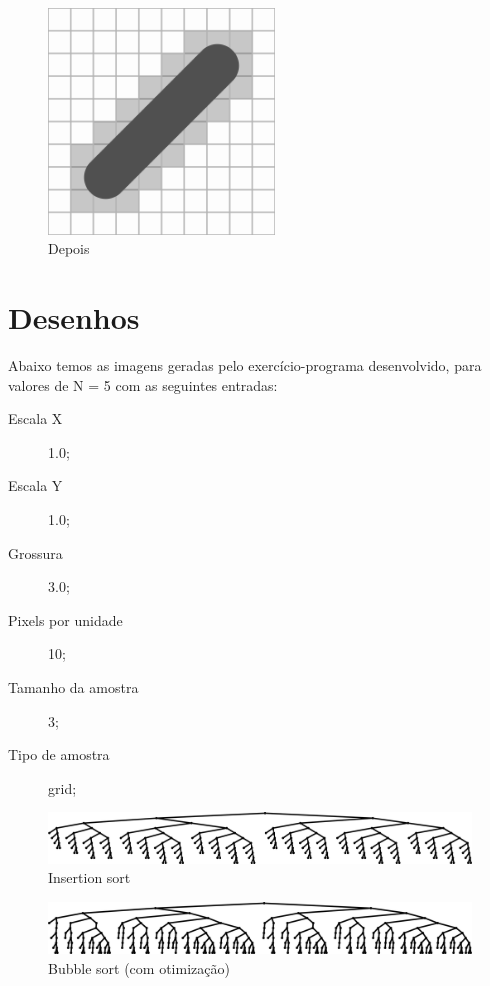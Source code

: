 \documentclass[12pt,a4paper]{article}
\begin{document}
	\begin{figure}[h!]
		\centering
		\includegraphics[height=6cm,keepaspectratio]{seg_depois.png}
		\caption{Depois}
	\end{figure}


	\section{Desenhos}
	\indent Abaixo temos as imagens geradas pelo exercício-programa desenvolvido, para valores de N = 5 com as seguintes entradas:\\
	\begin{description}
	\item [Escala X] 1.0;
	\item [Escala Y] 1.0;
	\item [Grossura] 3.0;
	\item [Pixels por unidade] 10;
	\item [Tamanho da amostra] 3;
	\item [Tipo de amostra] grid;
	\end{description}

	\begin{figure}[h!]
		\vspace*{0.3in}
		\centering
		\includegraphics[width=\textwidth]{insertion_sort.png}
		\caption{Insertion sort}
	\end{figure}

	\begin{figure}[h!]
		\vspace*{0.3in}
		\centering
		\includegraphics[width=\textwidth]{bubble_sort.png}
		\caption{Bubble sort (com otimização)}
	\end{figure}
\end{document}
